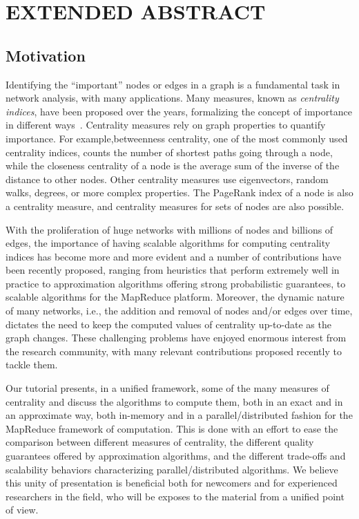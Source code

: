 \documentclass{sig-alternate}
\begin{document}
\pagebreak
\section*{EXTENDED ABSTRACT}

\subsection*{Motivation}
Identifying the ``important'' nodes or edges in a graph is a fundamental task
in network analysis, with many applications. Many measures, known as
\emph{centrality indices}, have been proposed over the years, formalizing the
concept of importance in different ways~\citep{Newman10}. Centrality measures
rely on graph properties to quantify importance. For example,betweenness
centrality, one of the most commonly used centrality indices, counts the number
of shortest paths going through a node, while the closeness centrality of a node
is the average sum of the inverse of the distance to other nodes. Other
centrality measures use eigenvectors, random walks, degrees, or more complex
properties. The PageRank index of a node is also a centrality measure, and
centrality measures for sets of nodes are also possible.

With the proliferation of huge networks with millions of nodes and billions of
edges, the importance of having scalable algorithms for computing centrality
indices has become more and more evident and a number of contributions have been
recently proposed, ranging from heuristics that perform extremely well in
practice to approximation algorithms offering strong probabilistic guarantees,
to scalable algorithms for the MapReduce platform. Moreover, the dynamic nature
of many networks, i.e., the addition and removal of nodes and/or edges over
time, dictates the need to keep the computed values of centrality up-to-date as
the graph changes. These challenging problems have enjoyed enormous interest
from the research community, with many relevant contributions proposed recently
to tackle them.

Our tutorial presents, in a unified framework, some of the many measures of
centrality and discuss the algorithms to compute them, both in an exact and in
an approximate way, both in-memory and in a parallel/distributed fashion for the
MapReduce framework of computation. This is done with an effort to ease the
comparison between different measures of centrality, the different quality
guarantees offered by approximation algorithms, and the different trade-offs and
scalability behaviors characterizing parallel/distributed algorithms. We believe
this unity of presentation is beneficial both for newcomers and for
experienced researchers in the field, who will be exposes to the material from a
unified point of view.
\end{document}
